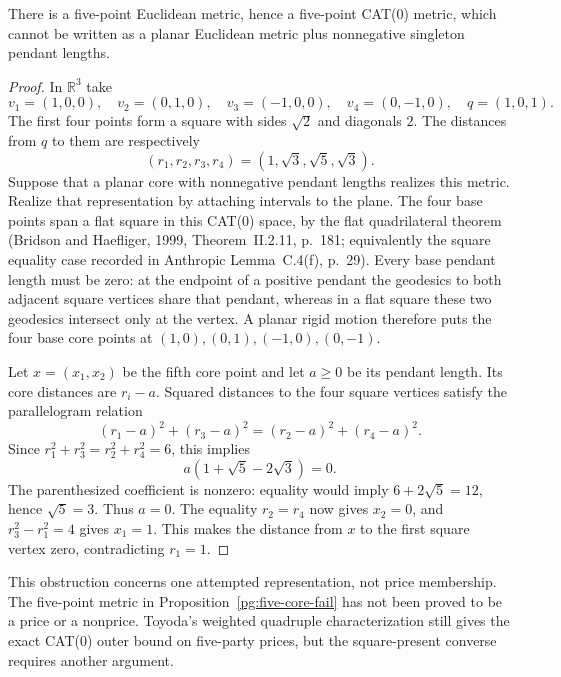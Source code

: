 \begin{proposition}
\label{pg:five-core-fail}
There is a five-point Euclidean metric, hence a five-point CAT(0)
metric, which cannot be written as a planar Euclidean metric plus
nonnegative singleton pendant lengths.
\end{proposition}
\begin{proof}
In $\mathbb R^3$ take
\[
 v_1=(1,0,0),\quad v_2=(0,1,0),\quad
 v_3=(-1,0,0),\quad v_4=(0,-1,0),\quad q=(1,0,1).
\]
The first four points form a square with sides $\sqrt2$ and diagonals
$2$. The distances from $q$ to them are respectively
\[
 (r_1,r_2,r_3,r_4)=(1,\sqrt3,\sqrt5,\sqrt3).
\]
Suppose that a planar core with nonnegative pendant lengths realizes
this metric. Realize that representation by attaching intervals to
the plane. The four base points span a flat square in this CAT(0)
space, by the flat quadrilateral theorem (Bridson and Haefliger, 1999,
Theorem~II.2.11, p.~181; equivalently the square equality case recorded
in Anthropic Lemma~C.4(f), p.~29). Every base pendant length must be
zero: at the endpoint of a positive pendant the geodesics to both
adjacent square vertices share that pendant, whereas in a flat square
these two geodesics intersect only at the vertex. A planar rigid motion
therefore puts the four base core points at $(1,0),(0,1),(-1,0),(0,-1)$.

Let $x=(x_1,x_2)$ be the fifth core point and let $a\geq0$ be its
pendant length. Its core distances are $r_i-a$. Squared distances to
the four square vertices satisfy the parallelogram relation
\[
 (r_1-a)^2+(r_3-a)^2=(r_2-a)^2+(r_4-a)^2.
\]
Since $r_1^2+r_3^2=r_2^2+r_4^2=6$, this implies
\[
 a(1+\sqrt5-2\sqrt3)=0.
\]
The parenthesized coefficient is nonzero: equality would imply
$6+2\sqrt5=12$, hence $\sqrt5=3$. Thus $a=0$.
The equality $r_2=r_4$ now gives $x_2=0$, and
$r_3^2-r_1^2=4$ gives $x_1=1$. This makes the distance from $x$ to
the first square vertex zero, contradicting $r_1=1$.
\end{proof}

This obstruction concerns one attempted representation, not price
membership. The five-point metric in Proposition~\ref{pg:five-core-fail}
has not been proved to be a price or a nonprice. Toyoda's weighted
quadruple characterization still gives the exact CAT(0) outer bound
on five-party prices, but the square-present converse requires another
argument.

